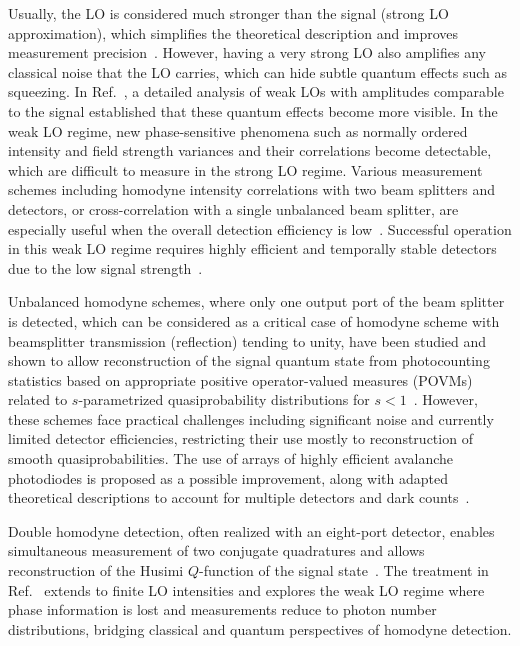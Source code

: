 \documentclass[%
reprint,
superscriptaddress,
 amsmath,amssymb,amsfonts,
 aps,
 pra,
 longbibliography
]{revtex4-2}
\begin{document}
Usually, the LO is considered much stronger than the signal (strong LO approximation), which simplifies the theoretical description and improves measurement precision~\cite{Vogel:bk:2006}. However, having a very strong LO also amplifies any classical noise that the LO carries, which can hide subtle quantum effects such as squeezing. In Ref.~\cite{PhysRevA.51.4160}, a detailed analysis of weak LOs with amplitudes comparable to the signal established that these quantum effects become more visible. In the weak LO regime, new phase-sensitive phenomena such as normally ordered intensity and field strength variances and their correlations become detectable, which are difficult to measure in the strong LO regime. Various measurement schemes including homodyne intensity correlations with two beam splitters and detectors, or cross-correlation with a single unbalanced beam splitter, are especially useful when the overall detection efficiency is low~\cite{PhysRevA.51.4160}. Successful operation in this weak LO regime requires highly efficient and temporally stable detectors due to the low signal strength~\cite{PhysRevA.51.4160,Schumaker:84}.

Unbalanced homodyne schemes, where only one output port of the beam splitter is detected, which can be considered as a critical case of homodyne scheme with beamsplitter transmission (reflection) tending to unity, have been studied and shown to allow reconstruction of the signal quantum state from photocounting statistics based on appropriate positive operator-valued measures (POVMs) related to $s$-parametrized quasiprobability distributions for $s<1$~\cite{PhysRevA.53.4528}. However, these schemes face practical challenges including significant noise and currently limited detector efficiencies, restricting their use mostly to reconstruction of smooth quasiprobabilities. The use of arrays of highly efficient avalanche photodiodes is proposed as a possible improvement, along with adapted theoretical descriptions to account for multiple detectors and dark counts~\cite{PhysRevA.101.031801,PhysRevA.85.023820,PhysRevA.92.053835}.

Double homodyne detection, often realized with an eight-port detector, enables simultaneous measurement of two conjugate quadratures and allows reconstruction of the Husimi $Q$-function of the signal state~\cite{Richter:98,PhysRevA.101.031801}. The treatment in Ref.~\cite{Cives_Esclop_2000} extends to finite LO intensities and explores the weak LO regime where phase information is lost and measurements reduce to photon number distributions, bridging classical and quantum perspectives of homodyne detection.
\end{document}
